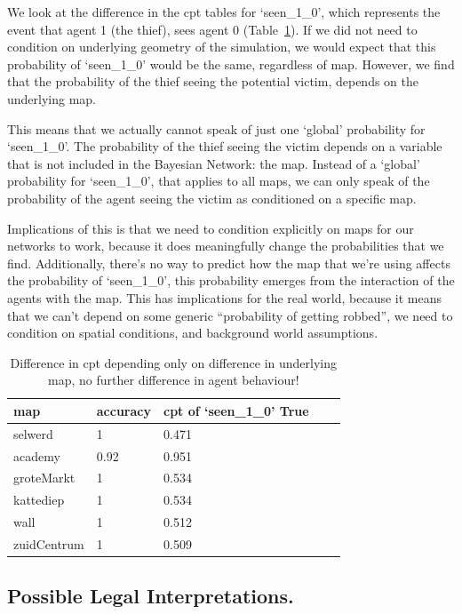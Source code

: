 We look at the difference in the cpt tables for `seen\_1\_0', which represents the event that agent 1 (the thief), sees agent 0 (Table~\ref{mapstab}). If we did not need to condition on underlying geometry of the simulation, we would expect that this probability of `seen\_1\_0' would be the same, regardless of map. However, we find that the probability of the thief seeing the potential victim, depends on the underlying map. 

This means that we actually cannot speak of just one `global' probability for `seen\_1\_0'. The probability of the thief seeing the victim depends on a variable that is not included in the Bayesian Network: the map. Instead of a `global' probability for `seen\_1\_0', that applies to all maps, we can only speak of the probability of the agent seeing the victim as conditioned on a specific map. 

Implications of this is that we need to condition explicitly on maps for our networks to work, because it does meaningfully change the probabilities that we find. Additionally, there's no way to predict how the map that we're using affects the probability of `seen\_1\_0', this probability emerges from the interaction of the agents with the map. This has implications for the real world, because it means that we can't depend on some generic ``probability of getting robbed'', we need to condition on spatial conditions, and background world assumptions.

\begin{table}[htbp]
\begin{tabular}{lllll}
map & accuracy & cpt of `seen\_1\_0' True \\
\hline
selwerd& 1 & 0.471\\
academy & 0.92 & 0.951\\
groteMarkt & 1 & 0.534\\
kattediep & 1 & 0.534\\
wall & 1 & 0.512\\
zuidCentrum &1 & 0.509\\
\end{tabular}
\caption{Difference in cpt depending only on difference in underlying map, no further difference in agent behaviour!}
\label{mapstab}
\end{table}



\subsection{Possible Legal Interpretations.}

